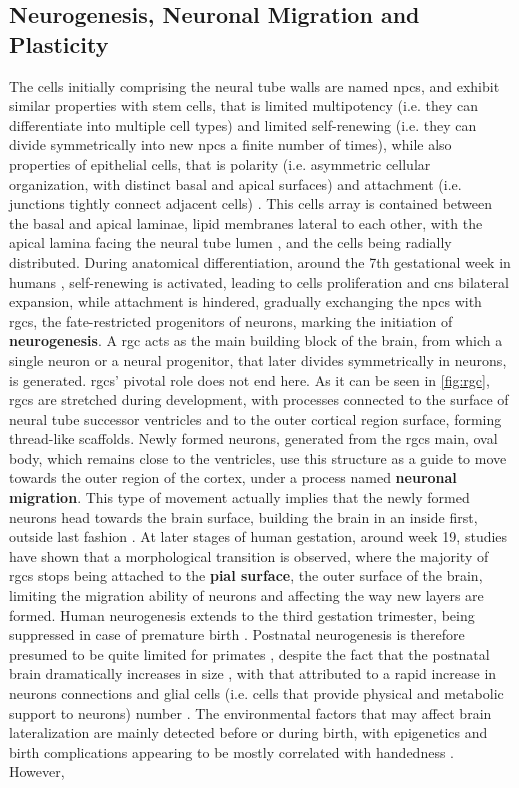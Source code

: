 \subsection{Neurogenesis, Neuronal Migration and Plasticity}
The cells initially comprising the neural tube walls are named \acp{npc}, and exhibit similar properties with stem cells, that is limited multipotency (i.e. they can differentiate into multiple cell types) and limited self-renewing (i.e. they can divide symmetrically into new \acp{npc} a finite number of times), while also properties of epithelial cells, that is polarity (i.e. asymmetric cellular organization, with distinct basal and apical surfaces)  and attachment (i.e. junctions tightly connect adjacent cells) \cite{Gotz2005}. This cells array is contained between the basal and apical laminae, lipid membranes lateral to each other, with the apical lamina facing the neural tube lumen \cite{Aaku-Saraste1997}, and the cells being radially distributed. During anatomical differentiation, around the 7th gestational week in humans \cite{Nowakowski2016}, self-renewing is activated, leading to cells proliferation and \ac{cns} bilateral expansion, while attachment is hindered, gradually exchanging the \acp{npc} with \acp{rgc}, the fate-restricted progenitors of neurons, marking the initiation of \textbf{neurogenesis}\cite{Gotz2005}. A \ac{rgc} acts as the main building block of the brain, from which a single neuron or a neural progenitor, that later divides symmetrically in neurons, is generated. \Acp{rgc}' pivotal role does not end here. As it can be seen in \autoref{fig:rgc}, \acsp{rgc} are stretched during development, with processes connected to the surface of neural tube successor ventricles and to the outer cortical region surface, forming thread-like scaffolds. Newly formed neurons, generated from the \acsp{rgc} main, oval body, which remains close to the ventricles, use this structure as a guide to move towards the outer region of the cortex, under a process named \textbf{neuronal migration}\cite{Rakic2009}. This type of movement actually implies that the newly formed neurons head towards the brain surface, building the brain in an inside first, outside last fashion \cite{Molnar2019}. At later stages of human gestation, around week 19, studies have shown that a morphological transition is observed, where the majority of \acp{rgc} stops being attached to the \textbf{pial surface}, the outer surface of the brain, limiting the migration ability of neurons  \cite{Nowakowski2016} and affecting the way new layers are formed. Human neurogenesis extends to the third gestation trimester, being suppressed in case of premature birth \cite{Malik2013}. Postnatal neurogenesis is therefore presumed to be quite limited for primates \cite{Ernst2015}, despite the fact that the postnatal brain  dramatically increases in size , with that attributed to a rapid increase in neurons connections and glial cells (i.e. cells that provide physical and metabolic support to neurons) number \cite{Dyck2017}. The environmental factors that may affect brain lateralization are mainly detected before or during birth, with epigenetics and birth complications  appearing to be mostly correlated with handedness \cite{Schmitz2019,Cara2022}. However, 
